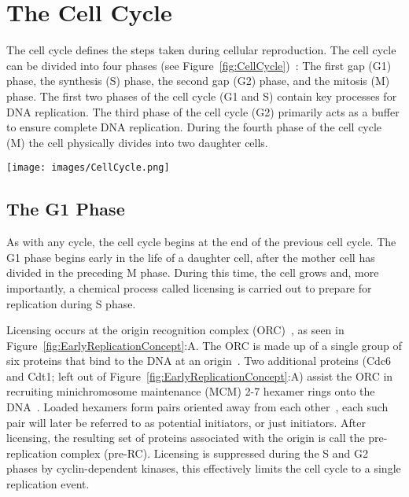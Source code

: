 	\section{The Cell Cycle}
	\label{sec:CellCycle}
	
	The cell cycle defines the steps taken during cellular reproduction.
	The cell cycle can be divided into four phases (see Figure~\ref{fig:CellCycle})~\cite{MolecularCellBiology,CellMolApproach}:
	The first gap (G1) phase, the synthesis (S) phase, the second gap (G2) phase, and the mitosis (M) phase.
	The first two phases of the cell cycle (G1 and S) contain key processes for DNA replication.
	The third phase of the cell cycle (G2) primarily acts as a buffer to ensure complete DNA replication.
	During the fourth phase of the cell cycle (M) the cell physically divides into two daughter cells.
	
	\begin{SCfigure}[1][thb]
		\texttt{[image: images/CellCycle.png]}
		\caption[Cell Cycle]{\label{fig:CellCycle} The complete cell cycle is made up of four phases: 
			The Mitosis (M) phase, when a mother cell separates into two daughter cells. 
			The first Gap (G1) phase, when the daughter cell undergoes growth and chemical preparation for DNA replication.
			The Synthesis (S) phase, when the DNA is replicated.
			And the second Gap (G2) phase which acts as a buffer to ensure complete replication before the M phase.}
	\end{SCfigure}
	
	
		\subsection{The G1 Phase}
		\label{subsec:G1Phase}
		
		As with any cycle, the cell cycle begins at the end of the previous cell cycle.
		The G1 phase begins early in the life of a daughter cell, after the mother cell has divided in the preceding M phase.
		During this time, the cell grows and, more importantly, a chemical process called licensing is carried out to prepare for replication during S phase.
		
		Licensing occurs at the origin recognition complex (ORC)~\cite{DNAInitiation}, as seen in Figure~\ref{fig:EarlyReplicationConcept}:A.
		The ORC is made up of a single group of six proteins that bind to the DNA at an origin~\cite{ORC}.
		Two additional proteins (Cdc6 and Cdt1; left out of Figure~\ref{fig:EarlyReplicationConcept}:A) assist the ORC in recruiting minichromosome maintenance (MCM) 2-7 hexamer rings onto the DNA~\cite{DNARepInitiation}.
		Loaded hexamers form pairs oriented away from each other~\cite{MCMPairs}, each such pair will later be referred to as potential initiators, or just initiators.
		After licensing, the resulting set of proteins associated with the origin is call the pre-replication complex (pre-RC).
		Licensing is suppressed during the S and G2 phases by cyclin-dependent kinases, this effectively limits the cell cycle to a single replication event.~\cite{MolecularCellBiology}
		
